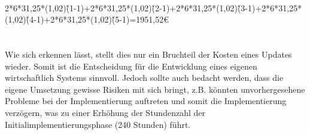 \\
2*6*31,25*(1,02)\^(1-1)+2*6*31,25*(1,02)\^(2-1)+2*6*31,25*(1,02)\^(3-1)+2*6*31,25*(1,02)\^(4-1)+2*6*31,25*(1,02)\^(5-1)=1951,52€\\
\\
\\
Wie sich erkennen lässt, stellt dies nur ein Bruchteil der Kosten eines Updates wieder.
Somit ist die Entscheidung für die Entwicklung eines eigenen wirtschaftlich Systems sinnvoll.
Jedoch sollte auch bedacht werden, dass die eigene Umsetzung gewisse Risiken mit sich bringt, z.B. könnten unvorhergesehene Probleme bei der Implementierung auftreten und somit die Implementierung verzögern, was zu einer Erhöhung der Stundenzahl der Initialimplementierungsphase (240 Stunden) führt.\\
